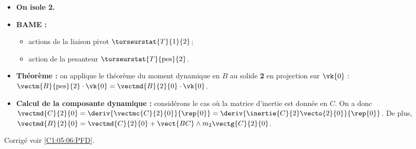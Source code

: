\begin{itemize}
\item \textbf{On isole 2.}
\item \textbf{BAME :}
\begin{itemize}
\item actions de la liaison pivot $\torseurstat{T}{1}{2}$;
\item action de la pesanteur $\torseurstat{T}{\text{pes}}{2}$.
\end{itemize}
\item \textbf{Théorème :} on applique le théorème du moment dynamique en $B$ au solide \textbf{2} en projection sur $\vk{0}$ : $\vectm{B}{\text{pes}}{2}\cdot \vk{0}  = \vectmd{B}{2}{0}\cdot \vk{0}$.
\item \textbf{Calcul de la composante dynamique :} considérons le cas où la matrice d'inertie est donnée en $C$. On a donc 
$\vectmd{C}{2}{0}= \deriv{\vectmc{C}{2}{0}}{\rep{0}}=\deriv{\inertie{C}{2}\vecto{2}{0}}{\rep{0}}$. De plus, 
$\vectmd{B}{2}{0}=\vectmd{C}{2}{0}+\vect{BC}\wedge m_2 \vectg{C}{2}{0}$.
\end{itemize}
\else
\fi

\ifprof
\else
\begin{flushright}
\footnotesize{Corrigé  voir \ref{C1:05:06:PFD}.}
\end{flushright}%
\fi